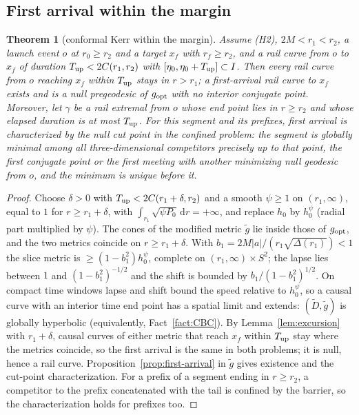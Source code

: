 \documentclass[aip,jmp,amsmath,amssymb,reprint]{revtex4-2}
\newcommand{\dd}{\mathrm{d}}
\newcommand{\gopt}{g_{\rm opt}}
\theoremstyle{plain}
\newtheorem{theorem}{Theorem}
\theoremstyle{definition}
\begin{document}
\subsection{First arrival within the margin}
\begin{theorem}[conformal Kerr within the margin]\label{thm:kerr}
Assume (H2), $2M<r_1<r_2$, a launch event $o$ at $r_0\ge r_2$ and a target $x_f$ with
$r_f\ge r_2$, and a rail curve from $o$ to $x_f$ of duration $T_{\rm up}<2C(r_1,r_2)$ with
$[\eta_0,\eta_0+T_{\rm up}]\subset I$. Then every rail curve from $o$ reaching $x_f$ within
$T_{\rm up}$ stays in $r>r_1$; a first-arrival rail curve to $x_f$ exists and is a null
pregeodesic of $\gopt$ with no interior conjugate point. Moreover, let $\gamma$ be a rail
extremal from $o$ whose end point lies in $r\ge r_2$ and whose elapsed duration is at most
$T_{\rm up}$. For this segment and its prefixes, first arrival is characterized by the null
cut point in the confined problem: the segment is globally minimal among all
three-dimensional competitors precisely up to that point, the first conjugate point or the
first meeting with another minimizing null geodesic from $o$, and the minimum is unique
before it.
\end{theorem}

\begin{proof}
Choose $\delta>0$ with $T_{\rm up}<2C(r_1+\delta,r_2)$ and a smooth $\psi\ge1$ on $(r_1,\infty)$,
equal to $1$ for $r\ge r_1+\delta$, with $\int_{r_1}\sqrt{\psi P_0}\,\dd r=+\infty$, and replace
$h_0$ by $h_0^\psi$ (radial part multiplied by $\psi$). The cones of the modified metric
$\tilde g$ lie inside those of $\gopt$, and the two metrics coincide on $r\ge r_1+\delta$. With
$b_1=2M|a|/(r_1\sqrt{\Delta(r_1)})<1$ the slice metric is $\ge(1-b_1^2)h_0^\psi$, complete on
$(r_1,\infty)\times S^2$; the lapse lies between $1$ and $(1-b_1^2)^{-1/2}$ and the shift is
bounded by $b_1/(1-b_1^2)^{1/2}$. On compact time windows lapse and shift bound the speed
relative to $h_0^\psi$, so a causal curve with an interior time end point has a spatial limit
and extends: $(\tilde D,\tilde g)$ is globally hyperbolic (equivalently,
Fact~\ref{fact:CBC}). By Lemma~\ref{lem:excursion} with $r_1+\delta$, causal curves of either
metric that reach $x_f$ within $T_{\rm up}$ stay where the metrics coincide, so the first
arrival is the same in both problems; it is null, hence a rail curve.
Proposition~\ref{prop:first-arrival} in $\tilde g$ gives existence and the cut-point
characterization. For a prefix of a segment ending in $r\ge r_2$, a competitor to the prefix
concatenated with the tail is confined by the barrier, so the characterization holds for
prefixes too.
\end{proof}
\end{document}
